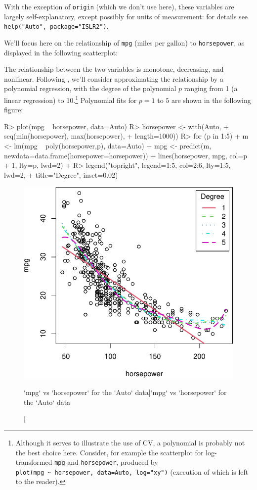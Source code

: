 \documentclass[
]{jss}
\begin{document}
With the exception of \texttt{origin} (which we don't use here), these
variables are largely self-explanatory, except possibly for units of
measurement: for details see \texttt{help("Auto",\ package="ISLR2")}.

We'll focus here on the relationship of \texttt{mpg} (miles per gallon)
to \texttt{horsepower}, as displayed in the following scatterplot:

The relationship between the two variables is monotone, decreasing, and
nonlinear. Following \citet{JamesEtAl:2021}, we'll consider
approximating the relationship by a polynomial regression, with the
degree of the polynomial \(p\) ranging from 1 (a linear regression) to
10.\footnote{Although it serves to illustrate the use of CV, a
  polynomial is probably not the best choice here. Consider, for example
  the scatterplot for log-transformed \texttt{mpg} and
  \texttt{horsepower}, produced by
  \texttt{plot(mpg\ \textasciitilde{}\ horsepower,\ data=Auto,\ log="xy")}
  (execution of which is left to the reader).} Polynomial fits for
\(p = 1\) to \(5\) are shown in the following figure:

\begin{CodeChunk}
\begin{CodeInput}
R> plot(mpg ~ horsepower, data=Auto)
R> horsepower <- with(Auto, 
+                    seq(min(horsepower), max(horsepower), 
+                        length=1000))
R> for (p in 1:5){
+   m <- lm(mpg ~ poly(horsepower,p), data=Auto)
+   mpg <- predict(m, newdata=data.frame(horsepower=horsepower))
+   lines(horsepower, mpg, col=p + 1, lty=p, lwd=2)
+ }
R> legend("topright", legend=1:5, col=2:6, lty=1:5, lwd=2,
+        title="Degree", inset=0.02)
\end{CodeInput}
\begin{figure}

{\centering \includegraphics[width=0.5\linewidth]{JSS-article-reduced_files/figure-latex/mpg-horsepower-scatterplot-polynomials-1} 

}

\caption[`mpg` vs `horsepower` for the `Auto` data]{`mpg` vs `horsepower` for the `Auto` data}\label{fig:mpg-horsepower-scatterplot-polynomials}
\end{figure}
\end{CodeChunk}
\end{document}
